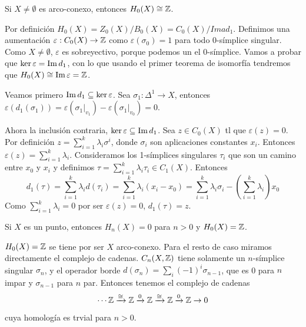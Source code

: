 \documentclass[TA.tex]{subfiles}
\begin{document}
\begin{prop}\label{2.7}
Si $X\neq\emptyset$ es arco-conexo, entonces $H_0(X)\cong\mathbb{Z}$. 
\end{prop}
\begin{dem}
Por definición $H_0(X)=Z_0(X)/B_0(X)=C_0(X)/Ima d_1$. Definimos una aumentación $\varepsilon:C_0(X)\to\mathbb{Z}$ como $\varepsilon(\sigma_0)=1$ para todo 0-símplice singular. Como $X\neq\emptyset$, $\varepsilon$ es sobreyectivo, porque podemos un el 0-símplice. Vamos a probar que $\ker\varepsilon=\operatorname{Im} d_1$, con lo que usando el primer teorema de isomorfía tendremos que $H_0(X)\cong \operatorname{Im}\varepsilon=\mathbb{Z}$. 

Veamos primero $\operatorname{Im} d_1\subseteq\ker\varepsilon$. Sea $\sigma_1:\Delta^1\to X$, entonces $\varepsilon(d_1(\sigma_1))=\varepsilon(\sigma_1|_{v_1})-\varepsilon(\sigma_1|_{v_0})=0$.

Ahora la inclusión contraria, $\ker\varepsilon\subseteq\operatorname{Im} d_1$. Sea $z\in C_0(X)$ tl que $\varepsilon(z)=0$. Por definición $z=\sum_{i=1}^k \lambda_i\sigma^i$, donde $\sigma_i$ son aplicaciones constantes $x_i$. Entonces $\varepsilon(z)=\sum_{i=1}^k\lambda_i$. Consideramos los 1-símplices singulares $\tau_i$ que son un camino entre $x_0$ y $x_i$ y definimos $\tau=\sum_{i=1}^k\lambda_i\tau_i\in C_1(X)$. Entonces
\[
d_1(\tau)=\sum_{i=1}^k \lambda_id(\tau_i)=\sum_{i=1}^k \lambda_i(x_i-x_0)=\sum_{i=1}^k\lambda_i\sigma_i-(\sum_{i=1}^k\lambda_i)x_0
\]
Como $\sum_{i=1}^k\lambda_i=0$ por ser $\varepsilon(z)=0$,  $d_1(\tau)=z$. \QED
\end{dem}

\begin{prop}
Si $X$ es un punto, entonces $H_n(X)=0$ para $n>0$ y $H_0(X)=\mathbb{Z}$.
\end{prop}

\begin{dem}
$H_0(X)=\mathbb{Z}$ se tiene por ser $X$ arco-conexo. Para el resto de caso miramos directamente el complejo de cadenas. $C_n(X,\mathbb{Z})$ tiene solamente un $n$-símplice singular $\sigma_n$, y el operador borde $d(\sigma_n)=\sum_i (-1)^i\sigma_{n-1}$, que es 0 para $n$ impar y $\sigma_{n-1}$ para $n$ par. Entonces tenemos el complejo de cadenas
\[
\cdots\mathbb{Z}\xrightarrow{\cong}\mathbb{Z}\xrightarrow{0}\mathbb{Z}\xrightarrow{\cong}\mathbb{Z}\xrightarrow{0}\mathbb{Z}\to 0
\]
cuya homología es trvial para $n>0$. 
\QED
\end{dem}
\end{document}
